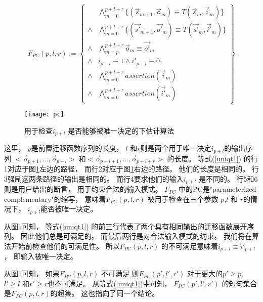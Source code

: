 \begin{equation}\label{uniqt1}
F_{PC}(p,l,r):=
\left\{
\begin{array}{cc}
&\bigwedge_{m=0}^{p+l+r}
\{
(\vec{s}_{m+1},\vec{o}_m)\equiv T(\vec{s}_m,\vec{i}_m)
\}
\\
\wedge&\bigwedge_{m=0}^{p+l+r}
\{
(\vec{s'}_{m+1},\vec{o'}_m)\equiv T(\vec{s'}_m,\vec{i'}_m)
\}
\\
\wedge&\bigwedge_{m=p}^{p+l+r}\vec{o}_m\equiv \vec{o'}_m \\
\wedge& i_{p+l}\equiv 1 \wedge  i'_{p+l}\equiv 0 \\
\wedge&\bigwedge_{m=0}^{p+l+r}assertion(\vec{i}_m) \\
\wedge&\bigwedge_{m=0}^{p+l+r}assertion(\vec{i'}_m)
\end{array}
\right\}
\end{equation}

\begin{figure}[b]
\begin{center}
\texttt{[image: pc]}
\end{center}
\caption{用于检查$i_{p+l}$ 是否能够被唯一决定的下估计算法}
  \label{fig_pc}
\end{figure}


这里，
$p$是前置迁移函数序列的长度，
$l$ 和$r$则是两个用于唯一决定$i_{p+l}$的输出序列
$<\vec{o}_{p+1},\dots,\vec{o}_{p+l}>$ 和$<\vec{o}_{p+l+1},\dots,\vec{o}_{p+l+r}>$
的长度。
等式(\ref{uniqt1}) 的行1对应于图\ref{fig_pc}左边的路径，
而行2对应于图\ref{fig_pc}右边的路径。
他们的长度是相同的。
行3强制这两条路径的输出是相同的。
而行4要求他们的输入$i_{p+l}$ 是不同的。
行5和6则是用户给出的断言，
用于约束合法的输入模式。
$F_{PC}$ 中的PC是"parameterized complementary"的缩写，
意味着$F_{PC}(p,l,r)$ 被用于检查在三个参数 $p$,$l$ 和 $r$的情况下，
$i_{p+l}$能否被唯一决定。


从图\ref{fig_pc}可知，
等式(\ref{uniqt1}) 的前三行代表了两个具有相同输出的迁移函数展开序列。
因此他们总是可满足的。
而最后两行是对合法输入模式的约束。
我们将在算法开始前检查他们的可满足性。
所以$F_{PC}(p,l,r)$ 的不可满足意味着$i_{p+l}\equiv i'_{p+l}$，
即输入被唯一决定。

从图\ref{fig_pc}可知，
如果$F_{PC}(p,l,r)$ 不可满足
则$F_{PC}(p',l',r')$ 对于更大的$p'\ge p$, $l'\ge l$ 和$r'\ge r$也不可满足。
从等式(\ref{uniqt1})中可知，
$F_{PC}(p',l',r')$ 的短句集合是$F_{PC}(p,l,r)$的超集。
这也指向了同一个结论。

